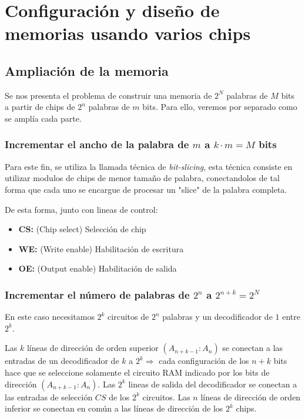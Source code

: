 \section{Configuración y diseño de memorias usando varios chips}
\subsection{Ampliación de la memoria}
Se nos presenta el problema de construir una memoria de $2^N$ palabras de $M$ bits a partir de chips de $2^n$ palabras de $m$ bits. Para ello, 
veremos por separado como se amplía cada parte.
\subsubsection{Incrementar el ancho de la palabra de $m$ a $k \cdot m= M$ bits}
Para este fin, se utiliza la llamada técnica de \textit{bit-slicing}, esta técnica
consiste en utilizar modulos de chips de menor tamaño de palabra, conectandolos de 
tal forma que cada uno se encargue de procesar un "slice" de la palabra completa.
\begin{center}
    
\end{center}
De esta forma, junto con lineas de control:
\begin{itemize}
    \item \textbf{CS:} (Chip select) Selección de chip
    \item \textbf{WE:} (Write enable) Habilitación de escritura
    \item \textbf{OE:} (Output enable) Habilitación de salida
\end{itemize}
\subsubsection{Incrementar el número de palabras de $2^n$ a $2^{n+k}=2^N$}
En este caso necesitamos $2^k$ circuitos de $2^n$ palabras y un decodificador de $1$ entre $2^k$.
\begin{center}
    
\end{center}
Las $k$ líneas de dirección de orden superior $(A_{n+k-1}:A_n)$ se conectan a las entradas de un decodificador de $k$
a $2^k \Rightarrow$ cada configuración de los $n+k$ bits hace que se seleccione solamente el circuito RAM indicado por 
los bits de dirección $(A_{n+k-1}:A_n)$. Las $2^k$ lineas de salida del decodificador se conectan a las entradas de selección  
$CS$ de los $2^k$ circuitos. Las $n$ líneas de dirección de orden inferior se conectan en común a las líneas de dirección
de los $2^k$ chips.
